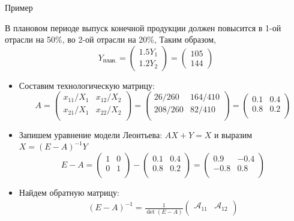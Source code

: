 \documentclass[unicode,11pt,notheorems,xcolor=table]{beamer}
\begin{document}
\begin{frame}[allowframebreaks]{Пример}{}
	\framebreak

	
	В плановом периоде выпуск конечной продукции должен повысится в 1-ой отрасли на 50\%, во 2-ой отрасли на 20\%,
	Таким образом, 
	$$
		Y_{\text{план.}}
		= 
		\begin{pmatrix}
			1.5Y_1\\ 1.2Y_2 
		\end{pmatrix}
		= 
		\begin{pmatrix}
			105\\ 144 
		\end{pmatrix}
	$$
	\begin{itemize}
		\item Составим технологическую матрицу:
			$$
				A 
				= \begin{pmatrix}
					x_{11}/X_1 & x_{12}/X_2 \\
					x_{21}/X_1 & x_{22}/X_2 \\
				\end{pmatrix}
				= \begin{pmatrix}
					26/260 & 164/410 \\
					208/260 & 82/410 \\
				\end{pmatrix}
				= \begin{pmatrix}
					0.1 & 0.4 \\
					0.8 & 0.2 \\
				\end{pmatrix}
			$$
		\item Запишем уравнение модели Леонтьева:
			$ AX+Y=X$ и выразим $X=(E-A)^{-1}Y$
			$$
			E-A 
			= \begin{pmatrix}
				1 & 0 \\
				0 & 1 \\
			\end{pmatrix}
			-
			\begin{pmatrix}
				0.1 & 0.4 \\
				0.8 & 0.2 \\
			\end{pmatrix}
			=
			\begin{pmatrix}
				 0.9 & -0.4 \\
				-0.8 & 0.8 \\
			\end{pmatrix}
			$$
		\item  Найдем обратную матрицу:
		\begin{multline*}
		(E-A)^{-1}= \frac{1}{\det(E-A)} \begin{pmatrix}
			\mathcal{A}_{11} & \mathcal{A}_{12}\\ 

\end{pmatrix}
\end{multline*}
\end{itemize}
\end{frame}
\end{document}
